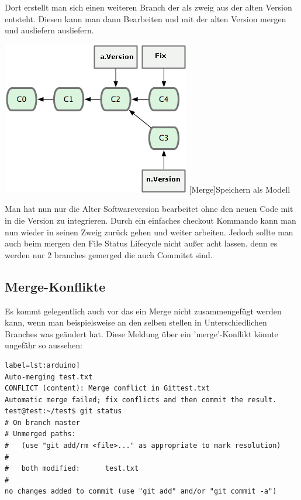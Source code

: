 \documentclass[12pt,a4paper,bibliography=totocnumbered,listof=totocnumbered]{scrartcl}
\begin{document}
Dort erstellt man sich einen weiteren Branch der als zweig aus der alten Version entsteht. Diesen kann man dann Bearbeiten und mit der alten Version mergen und ausliefern ausliefern.
 
\vspace{1em}
\begin{minipage}{\linewidth}
	\centering
	\includegraphics[width=0.6\linewidth]{Bilder/merge-fix.png}
	[Merge]{Speichern als Modell\footnotemark }
	\label{fig:gitspeichern}
\end{minipage}
Man hat nun nur die Alter Softwareversion bearbeitet ohne den neuen Code
mit in die Version zu integrieren. Durch ein einfaches checkout Kommando kann man nun wieder in seinen Zweig zurück gehen und weiter arbeiten. Jedoch sollte man auch beim mergen den File Status Lifecycle nicht außer acht lassen. denn es werden nur 2 branches gemerged die auch Commitet sind.

\subsection{Merge-Konflikte}
Es kommt gelegentlich auch vor das ein Merge nicht zusammengefügt werden kann, wenn man beispielsweise an den selben stellen in Unterschiedlichen Branches was geändert hat.	
Diese Meldung über ein 'merge'-Konflikt könnte ungefähr so aussehen:
\begin{lstlisting}[caption=Branch Konfilkt] label=lst:arduino]
Auto-merging test.txt
CONFLICT (content): Merge conflict in Gittest.txt
Automatic merge failed; fix conflicts and then commit the result.
test@test:~/test$ git status
# On branch master
# Unmerged paths:
#   (use "git add/rm <file>..." as appropriate to mark resolution)
#
#	both modified:      test.txt
#
no changes added to commit (use "git add" and/or "git commit -a")
\end{lstlisting}
\end{document}
